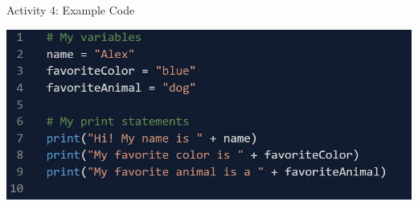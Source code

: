 \documentclass[hyperref={pdfpagemode=FullScreen},aspectratio=169]{beamer}
\begin{document}
  \begin{frame}{Activity 4: Example Code}
    \begin{center}
      \includegraphics[scale=0.65]{./imgs/activityFourCode.jpg}
    \end{center}
  \end{frame}
\end{document}
